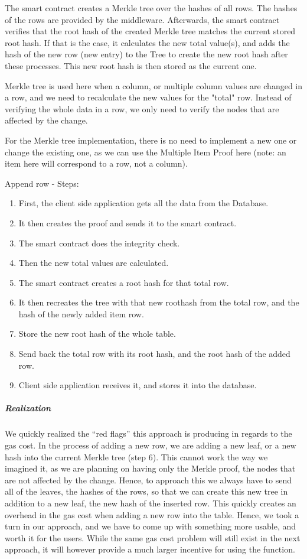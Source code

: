 The smart contract creates a Merkle tree over the hashes of all rows. The hashes of the rows are provided by the middleware. Afterwards, the smart contract verifies that the root hash of the created Merkle tree matches the current stored root hash. If that is the case, it calculates the new total value(s), and adds the hash of the new row (new entry) to the Tree to create the new root hash after these processes. This new root hash is then stored as the current one.

Merkle tree is used here when a column, or multiple column values are changed in a row, and we need to recalculate the new values for the "total" row. Instead of verifying the whole data in a row, we only need to verify the nodes that are affected by the change.

For the Merkle tree implementation, there is no need to implement a new one or change the existing one, as we can use the Multiple Item Proof here (note: an item here will correspond to a row, not a column).

Append row - Steps:
\begin{enumerate}
\item First, the client side application gets all the data from the Database.
\item It then creates the proof and sends it to the smart contract.
\item The smart contract does the integrity check.
\item Then the new total values are calculated.
\item The smart contract creates a root hash for that total row.
\item It then recreates the tree with that new roothash from the total row, and the hash of the newly added item row.
\item Store the new root hash of the whole table.
\item Send back the total row with its root hash, and the root hash of the added row.
\item Client side application receives it, and stores it into the database. 
\end{enumerate}

\subparagraph{Realization}

We quickly realized the “red flags” this approach is producing in regards to the gas cost. In the process of adding a new row, we are adding a new leaf, or a new hash into the current Merkle tree (step 6). This cannot work the way we imagined it, as we are planning on having only the Merkle proof, the nodes that are not affected by the change. Hence, to approach this we always have to send all of the leaves, the hashes of the rows, so that we can create this new tree in addition to a new leaf, the new hash of the inserted row. This quickly creates an overhead in the gas cost when adding a new row into the table. Hence, we took a turn in our approach, and we have to come up with something more usable, and worth it for the users. While the same gas cost problem will still exist in the next approach, it will however provide a much larger incentive for using the function. 

